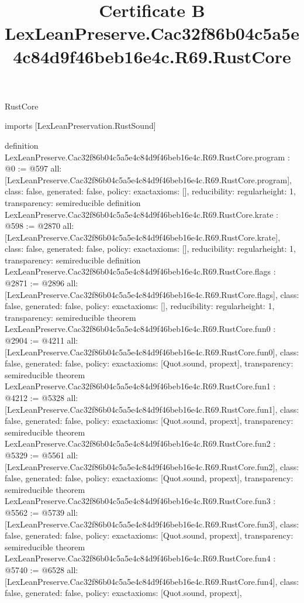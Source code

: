 \begin{lexlean}{RustCore}
\title{Certificate B LexLeanPreserve.Cac32f86b04c5a5e4c84d9f46beb16e4c.R69.RustCore}
\begin{coremodule}
imports [LexLeanPreservation.RustSound]

definition LexLeanPreserve.Cac32f86b04c5a5e4c84d9f46beb16e4c.R69.RustCore.program : @0 := @597 {
  all: [LexLeanPreserve.Cac32f86b04c5a5e4c84d9f46beb16e4c.R69.RustCore.program],
  class: false,
  generated: false,
  policy: exact{axioms: []},
  reducibility: regular{height: 1},
  transparency: semireducible
}
definition LexLeanPreserve.Cac32f86b04c5a5e4c84d9f46beb16e4c.R69.RustCore.krate : @598 := @2870 {
  all: [LexLeanPreserve.Cac32f86b04c5a5e4c84d9f46beb16e4c.R69.RustCore.krate],
  class: false,
  generated: false,
  policy: exact{axioms: []},
  reducibility: regular{height: 1},
  transparency: semireducible
}
definition LexLeanPreserve.Cac32f86b04c5a5e4c84d9f46beb16e4c.R69.RustCore.flags : @2871 := @2896 {
  all: [LexLeanPreserve.Cac32f86b04c5a5e4c84d9f46beb16e4c.R69.RustCore.flags],
  class: false,
  generated: false,
  policy: exact{axioms: []},
  reducibility: regular{height: 1},
  transparency: semireducible
}
theorem LexLeanPreserve.Cac32f86b04c5a5e4c84d9f46beb16e4c.R69.RustCore.fun0 : @2904 := @4211 {
  all: [LexLeanPreserve.Cac32f86b04c5a5e4c84d9f46beb16e4c.R69.RustCore.fun0],
  class: false,
  generated: false,
  policy: exact{axioms: [Quot.sound, propext]},
  transparency: semireducible
}
theorem LexLeanPreserve.Cac32f86b04c5a5e4c84d9f46beb16e4c.R69.RustCore.fun1 : @4212 := @5328 {
  all: [LexLeanPreserve.Cac32f86b04c5a5e4c84d9f46beb16e4c.R69.RustCore.fun1],
  class: false,
  generated: false,
  policy: exact{axioms: [Quot.sound, propext]},
  transparency: semireducible
}
theorem LexLeanPreserve.Cac32f86b04c5a5e4c84d9f46beb16e4c.R69.RustCore.fun2 : @5329 := @5561 {
  all: [LexLeanPreserve.Cac32f86b04c5a5e4c84d9f46beb16e4c.R69.RustCore.fun2],
  class: false,
  generated: false,
  policy: exact{axioms: [Quot.sound, propext]},
  transparency: semireducible
}
theorem LexLeanPreserve.Cac32f86b04c5a5e4c84d9f46beb16e4c.R69.RustCore.fun3 : @5562 := @5739 {
  all: [LexLeanPreserve.Cac32f86b04c5a5e4c84d9f46beb16e4c.R69.RustCore.fun3],
  class: false,
  generated: false,
  policy: exact{axioms: [Quot.sound, propext]},
  transparency: semireducible
}
theorem LexLeanPreserve.Cac32f86b04c5a5e4c84d9f46beb16e4c.R69.RustCore.fun4 : @5740 := @6528 {
  all: [LexLeanPreserve.Cac32f86b04c5a5e4c84d9f46beb16e4c.R69.RustCore.fun4],
  class: false,
  generated: false,
  policy: exact{axioms: [Quot.sound, propext]},
}
\end{coremodule}
\end{lexlean}
